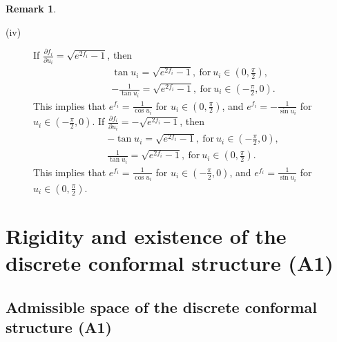 \documentclass[12pt]{amsart}
\theoremstyle{definition}
\newtheorem{remark}[theorem]{Remark}
\begin{document}
\begin{remark}
\begin{description}
\item[(iv)]
If $\frac{\partial f_i}{\partial u_i}=\sqrt{e^{2f_i}-1}$,
then
\begin{gather*}
\tan u_i=\sqrt{e^{2f_i}-1},\ \text{for}\ u_i\in (0,\frac{\pi}{2}),\\
-\frac{1}{\tan u_i}=\sqrt{e^{2f_i}-1},\ \text{for}\ u_i\in (-\frac{\pi}{2},0).
\end{gather*}
This implies that $e^{f_i}=\frac{1}{\cos u_i}$ for $u_i\in (0,\frac{\pi}{2})$, and $e^{f_i}=-\frac{1}{\sin u_i}$ for $u_i\in (-\frac{\pi}{2},0)$.
If $\frac{\partial f_i}{\partial u_i}=-\sqrt{e^{2f_i}-1}$,
then
\begin{gather*}
-\tan u_i=\sqrt{e^{2f_i}-1},\ \text{for}\ u_i\in (-\frac{\pi}{2},0),\\
\frac{1}{\tan u_i}=\sqrt{e^{2f_i}-1},\ \text{for}\ u_i\in (0,\frac{\pi}{2}).
\end{gather*}
This implies that $e^{f_i}=\frac{1}{\cos u_i}$ for $u_i\in (-\frac{\pi}{2},0)$, and $e^{f_i}=\frac{1}{\sin u_i}$ for $u_i\in (0,\frac{\pi}{2})$.
\end{description}
\end{remark}


\section{Rigidity and existence of the discrete conformal structure (A1)}\label{section A1}


\subsection{Admissible space of the discrete conformal structure (A1)}\label{section a4}
\end{document}
